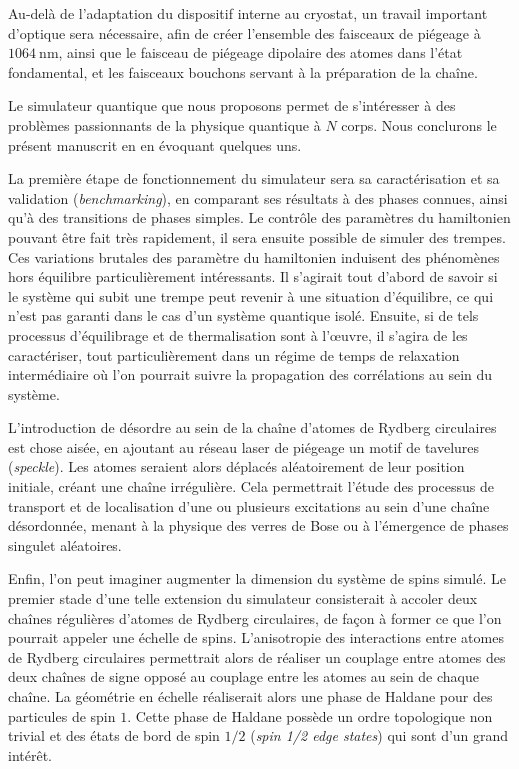 Au-delà de l'adaptation du dispositif interne au cryostat, un travail important d'optique sera nécessaire, afin de créer l'ensemble des faisceaux de piégeage à $\SI{1064}{\nano\meter}$, ainsi que le faisceau de piégeage dipolaire des atomes dans l'état fondamental, et les faisceaux \og bouchons \fg{} servant à la préparation de la chaîne.

\bigskip
Le simulateur quantique que nous proposons permet de s'intéresser à des problèmes passionnants de la physique quantique à $N$ corps.
Nous conclurons le présent manuscrit en en évoquant quelques uns.

La première étape de fonctionnement du simulateur sera sa caractérisation et sa validation (\textit{benchmarking}), en comparant ses résultats à des phases connues, ainsi qu'à des transitions de phases simples.
Le contrôle des paramètres du hamiltonien pouvant être fait très rapidement, il sera ensuite possible de simuler des trempes.
Ces variations brutales des paramètre du hamiltonien induisent des phénomènes hors équilibre particulièrement intéressants.
Il s'agirait tout d'abord de savoir si le système qui subit une trempe peut revenir à une situation d'équilibre, ce qui n'est pas garanti dans le cas d'un système quantique isolé.
Ensuite, si de tels processus d'équilibrage et de thermalisation sont à l'\oe uvre, il s'agira de les caractériser, tout particulièrement dans un régime de temps de relaxation intermédiaire où l'on pourrait suivre la propagation des corrélations au sein du système.

L'introduction de désordre au sein de la chaîne d'atomes de Rydberg circulaires est chose aisée, en ajoutant au réseau laser de piégeage un motif de tavelures (\textit{speckle}).
Les atomes seraient alors déplacés aléatoirement de leur position initiale, créant une chaîne irrégulière.
Cela permettrait l'étude des processus de transport et de localisation d'une ou plusieurs excitations au sein d'une chaîne désordonnée, menant à la physique des verres de Bose ou à l'émergence de phases singulet aléatoires.

Enfin, l'on peut imaginer augmenter la dimension du système de spins simulé.
Le premier stade d'une telle extension du simulateur consisterait à accoler deux chaînes régulières d'atomes de Rydberg circulaires, de façon à former ce que l'on pourrait appeler une \og échelle \fg{} de spins.
L'anisotropie des interactions entre atomes de Rydberg circulaires permettrait alors de réaliser un couplage entre atomes des deux chaînes de signe opposé au couplage entre les atomes au sein de chaque chaîne.
La géométrie en échelle réaliserait alors une phase de Haldane pour des particules de spin $1$.
Cette phase de Haldane possède un ordre topologique non trivial et des états de bord de spin $1/2$ (\textit{spin 1/2 edge states}) qui sont d'un grand intérêt.


